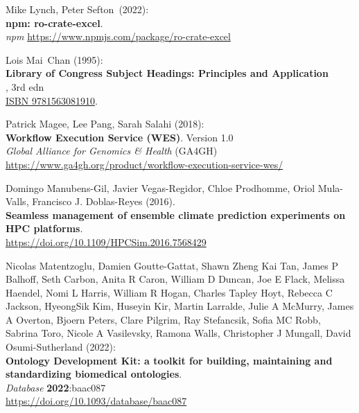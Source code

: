 \begin{thebibliography}{9}
Mike Lynch, Peter Sefton~(2022):\\
\textbf{npm: ro-crate-excel}.\\
\emph{npm} \url{https://www.npmjs.com/package/ro-crate-excel}

Lois Mai~Chan (1995):\\
\textbf{Library of Congress Subject Headings: Principles and Application}\\, 3rd edn\\
\href{https://identifiers.org/isbn/9781563081910}{ISBN 9781563081910}.

Patrick Magee, Lee Pang, Sarah Salahi (2018):\\
\textbf{Workflow Execution Service (WES)}. Version 1.0\\
\emph{Global Alliance for Genomics \& Health} (GA4GH)\\
\url{https://www.ga4gh.org/product/workflow-execution-service-wes/}

Domingo Manubens-Gil, Javier Vegas-Regidor, Chloe Prodhomme, Oriol Mula-Valls, Francisco J. Doblas-Reyes (2016).\\
\textbf{Seamless management of ensemble climate prediction experiments on HPC platforms}.\\
\url{https://doi.org/10.1109/HPCSim.2016.7568429}

Nicolas Matentzoglu, Damien Goutte-Gattat, Shawn Zheng Kai Tan, James P Balhoff, Seth Carbon, Anita R Caron, William D Duncan, Joe E Flack, Melissa Haendel, Nomi L Harris, William R Hogan, Charles Tapley Hoyt, Rebecca C Jackson, HyeongSik Kim, Huseyin Kir, Martin Larralde, Julie A McMurry, James A Overton, Bjoern Peters, Clare Pilgrim, Ray Stefancsik, Sofia MC Robb, Sabrina Toro, Nicole A Vasilevsky, Ramona Walls, Christopher J Mungall, David Osumi-Sutherland (2022):\\
\textbf{Ontology Development Kit: a toolkit for building, maintaining and standardizing biomedical ontologies}.\\
\emph{Database} \textbf{2022}:baac087 \\
\url{https://doi.org/10.1093/database/baac087}


\end{thebibliography}
